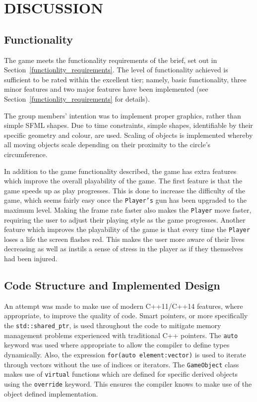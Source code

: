 \documentclass[10pt,twocolumn]{witseiepaper}
\begin{document}
\section{DISCUSSION}
\subsection{Functionality}

The game meets the functionality requirements of the brief, set out in Section~\ref{functionlity_requirements}. The level of functionality achieved is sufficient to be rated within the excellent tier; namely, basic functionality, three minor features and two major features have been implemented (see Section~\ref{functionlity_requirements} for details). 

The group members' intention was to implement proper graphics, rather than simple SFML shapes. Due to time constraints, simple shapes, identifiable by their specific geometry and colour, are used. Scaling of objects is implemented whereby all moving objects scale depending on their proximity to the circle's circumference.

In addition to the game functionality described, the game has extra features which improve the overall playability of the game. The first feature is that the game speeds up as play progresses. This is done to increase the difficulty of the game, which seems fairly easy once the \texttt{Player's} gun has been upgraded to the maximum level. Making the frame rate faster also makes the \texttt{Player} move faster, requiring the user to adjust their playing style as the game progresses. Another feature which improves the playability of the game is that every time the \texttt{Player} loses a life the screen flashes red. This makes the user more aware of their lives decreasing as well as instils a sense of stress in the player as if they themselves had been injured. 

\subsection{Code Structure and Implemented Design}\label{critical_code_structure}

An attempt was made to make use of modern  C++11/C++14 features, where appropriate, to improve the quality of code. Smart pointers, or more specifically the \texttt{std::shared\_ptr}, is used throughout the code to mitigate memory management problems experienced with traditional C++ pointers.  The \texttt{auto} keyword was used where appropriate to allow the compiler to define types dynamically. Also, the expression \texttt{for(auto element:vector)} is used to iterate through vectors without the use of indices or iterators. The \texttt{GameObject} class makes use of \texttt{virtual} functions which are defined for specific derived objects using the \texttt{override} keyword. This ensures the compiler knows to make use of the object defined implementation.
\end{document}
